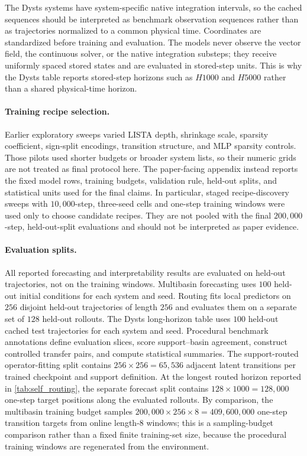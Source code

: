 The Dysts systems have system-specific native integration intervals, so the cached sequences should be interpreted as benchmark observation sequences rather than as trajectories normalized to a common physical time. Coordinates are standardized before training and evaluation. The models never observe the vector field, the continuous solver, or the native integration substeps; they receive uniformly spaced stored states and are evaluated in stored-step units. This is why the Dysts table reports stored-step horizons such as $H1000$ and $H5000$ rather than a shared physical-time horizon.

\paragraph{Training recipe selection.}
Earlier exploratory sweeps varied LISTA depth, shrinkage scale, sparsity coefficient, sign-split encodings, transition structure, and MLP sparsity controls. Those pilots used shorter budgets or broader system lists, so their numeric grids are not treated as final protocol here. The paper-facing appendix instead reports the fixed model rows, training budgets, validation rule, held-out splits, and statistical units used for the final claims.
In particular, staged recipe-discovery sweeps with $10{,}000$-step, three-seed cells and one-step training windows were used only to choose candidate recipes. They are not pooled with the final $200{,}000$-step, held-out-split evaluations and should not be interpreted as paper evidence.

\paragraph{Evaluation splits.}
All reported forecasting and interpretability results are evaluated on held-out trajectories, not on the training windows. Multibasin forecasting uses $100$ held-out initial conditions for each system and seed. Routing fits local predictors on $256$ disjoint held-out trajectories of length $256$ and evaluates them on a separate set of $128$ held-out rollouts. The Dysts long-horizon table uses $100$ held-out cached test trajectories for each system and seed. Procedural benchmark annotations define evaluation slices, score support--basin agreement, construct controlled transfer pairs, and compute statistical summaries.
The support-routed operator-fitting split contains \(256\times256=65{,}536\) adjacent latent transitions per trained checkpoint and support definition. At the longest routed horizon reported in \cref{tab:self_routing}, the separate forecast split contains \(128\times1000=128{,}000\) one-step target positions along the evaluated rollouts. By comparison, the multibasin training budget samples \(200{,}000\times256\times8=409{,}600{,}000\) one-step transition targets from online length-$8$ windows; this is a sampling-budget comparison rather than a fixed finite training-set size, because the procedural training windows are regenerated from the environment.

